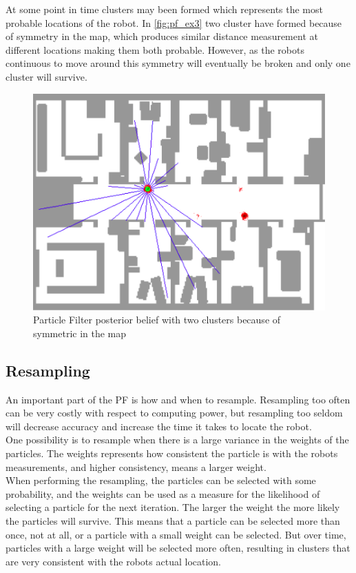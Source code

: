 At some point in time clusters may been formed which represents the most probable locations of the robot. In \autoref{fig:pf_ex3} two cluster have formed because of symmetry in the map, which produces similar distance measurement at different locations making them both probable. However, as the robots continuous to move around this symmetry will eventually be broken and only one cluster will survive.

\begin{figure}[H]
\centering
\includegraphics[scale=0.35]{images/particlefilter3}
\caption{Particle Filter posterior belief with two clusters because of symmetric in the map}
\label{fig:pf_ex3}
\end{figure}

\subsection{Resampling}

An important part of the PF is how and when to resample. Resampling too often can be very costly with respect to computing power, but resampling too seldom will decrease accuracy and increase the time it takes to locate the robot.\\
One possibility is to resample when there is a large variance in the weights of the particles. The weights represents how consistent the particle is with the robots measurements, and higher consistency, means a larger weight.\\
When performing the resampling, the particles can be selected with some probability, and the weights can be used as a measure for the likelihood of selecting a particle for the next iteration. The larger the weight the more likely the particles will survive. This means that a particle can be selected more than once, not at all, or a particle with a small weight can be selected. But over time, particles with a large weight will be selected more often, resulting in clusters that are very consistent with the robots actual location.

